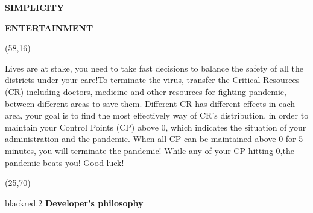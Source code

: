 \documentclass[hyperref={pdfpagelabels=false}]{beamer}
\begin{document}
\begin{frame}
\begin{textblock}{20}
\begin{blankbox}
\vspace{0.4cm}

			\textbf{SIMPLICITY}
\vspace{0.4cm}

\textbf{ENTERTAINMENT}
		\end{blankbox}
	\end{textblock}


	\begin{textblock}{40}(58,16)
		\begin{blankbox}


Lives are at stake, you need to take fast decisions to balance the safety of all the districts under your care!To terminate the virus, transfer the Critical Resources (CR) including doctors, medicine and other resources for fighting pandemic, between different areas to save them. Different CR has different effects in each area, your goal is to find the most effectively way of CR's distribution, in order to maintain your Control Points (CP) above 0, which indicates the situation of your administration and the pandemic. When all CP can be maintained above 0 for 5 minutes, you will terminate the pandemic! While any of your CP hitting 0,the pandemic beats you! Good luck! 


		\end{blankbox}
	\end{textblock}





	
	\begin{textblock}{50}(25,70)
		\begin{transparentbox}{black}{red}{.2}
				\centering \vspace{.55cm}
				\huge\textbf{Developer's philosophy}\vspace{1cm}


\end{transparentbox}
\end{textblock}
\end{frame}
\end{document}

